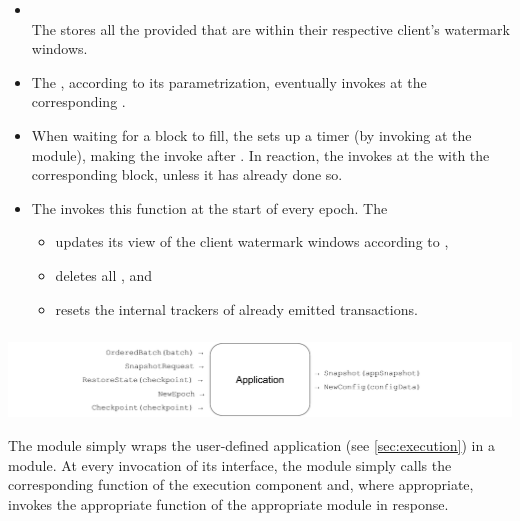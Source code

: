 \documentclass{article}
\begin{document}
\begin{itemize}

    \item {}\\
    The  stores all the provided  that are within their respective client's watermark windows.

    \item {}
    The , according to its parametrization, eventually invokes  at the corresponding .

    \item {}
    When waiting for a block to fill, the  sets up a timer
    (by invoking  at the  module),
    making the  invoke  after .
    In reaction, the  invokes  at the  with the corresponding block, unless it has already done so.

    \item {}
    The  invokes this function at the start of every epoch.
    The 
    \begin{itemize}
        \item updates its view of the client watermark windows according to ,
        \item deletes all , and
        \item resets the internal trackers of already emitted transactions.
    \end{itemize}

\end{itemize}

\subsubsection{}

\includegraphics[width=\textwidth]{figures/modules/module-application.pdf}

The  module simply wraps the user-defined application (see \cref{sec:execution}) in a module.
At every invocation of its interface, the  module simply calls the corresponding function of the execution component
and, where appropriate, invokes the appropriate function of the appropriate module in response.
\end{document}
